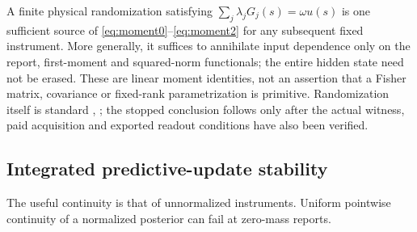 A finite physical randomization satisfying $\sum_j\lambda_jG_j(s)=\omega u(s)$ is one sufficient source of \eqref{eq:moment0}--\eqref{eq:moment2} for any subsequent fixed instrument. More generally, it suffices to annihilate input dependence only on the report, first-moment and squared-norm functionals; the entire hidden state need not be erased. These are linear moment identities, not an assertion that a Fisher matrix, covariance or fixed-rank parametrization is primitive. Randomization itself is standard \cite{Luschgy}, \cite{AMTW}; the stopped conclusion follows only after the actual witness, paid acquisition and exported readout conditions have also been verified.

\subsection*{Integrated predictive-update stability}
The useful continuity is that of unnormalized instruments. Uniform pointwise continuity of a normalized posterior can fail at zero-mass reports.


